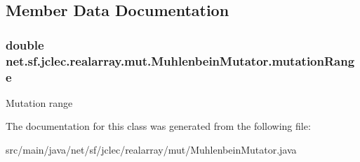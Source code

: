 \subsection{Member Data Documentation}
\hypertarget{classnet_1_1sf_1_1jclec_1_1realarray_1_1mut_1_1_muhlenbein_mutator_a6bb0c418a6e02778dd1e4192f31afe4a}{
\subsubsection[{mutation\-Range}]{\setlength{\rightskip}{0pt plus 5cm}double net.\-sf.\-jclec.\-realarray.\-mut.\-Muhlenbein\-Mutator.\-mutation\-Range\hspace{0.3cm}{\ttfamily [protected]}}}\label{classnet_1_1sf_1_1jclec_1_1realarray_1_1mut_1_1_muhlenbein_mutator_a6bb0c418a6e02778dd1e4192f31afe4a}
Mutation range 

The documentation for this class was generated from the following file\-:\begin{DoxyCompactItemize}
\item 
src/main/java/net/sf/jclec/realarray/mut/Muhlenbein\-Mutator.\-java\end{DoxyCompactItemize}
